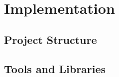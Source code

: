 \documentclass[crop=false]{standalone}
\begin{document}
  \section{Implementation} %
  \label{sec:implementation}
    \subsection{Project Structure} %
    \label{sub:project_structure}

    \subsection{Tools and Libraries} %
    \label{sub:tools_and_libraries}

\end{document}
